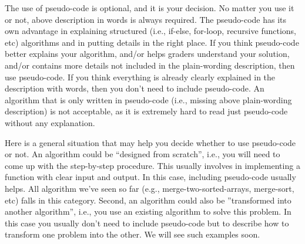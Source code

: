 \documentclass[11pt]{article}
\begin{document}
The use of pseudo-code is optional, and it is your decision. No matter you use it or not, above description in words is always required. The pseudo-code has its own advantage in explaining structured (i.e., if-else, for-loop, recursive functions, etc) algorithms and in putting details in the right place. If you think pseudo-code better explains your algorithm, and/or helps graders understand your solution, and/or contains more details not included in the plain-wording description, then use pseudo-code. If you think everything is already clearly explained in the description with words, then you don't need to include pseudo-code. An algorithm that is only written in pseudo-code (i.e., missing above plain-wording description) is not acceptable, as it is extremely hard to read just pseudo-code without any explanation.

Here is a general situation that may help you decide whether to use pseudo-code or not. An algorithm could be ``designed from scratch'', i.e., you will need to come up with the step-by-step procedure. This usually involves in implementing a function with clear input and output. In this case, including pseudo-code usually helps. All algorithm we've seen so far (e.g., merge-two-sorted-arrays, merge-sort, etc) falls in this category. Second, an algorithm could also be ''transformed into another algorithm'', i.e., you use an existing algorithm to solve this problem. In this case you usually don't need to include pseudo-code but to describe how to transform one problem into the other. We will see such examples soon.
\end{document}
